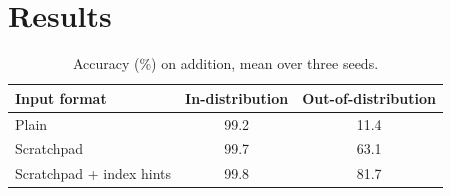 \section{Results}
\label{sec:results}


\begin{table}[t]
\centering
\begin{tabular}{lcc}
\toprule
Input format & In-distribution & Out-of-distribution \\
\midrule
Plain & 99.2 & 11.4 \\
Scratchpad & 99.7 & 63.1 \\
Scratchpad + index hints & 99.8 & 81.7 \\
\bottomrule
\end{tabular}
\caption{Accuracy (\%) on addition, mean over three seeds.}
\label{tab:main}
\end{table}
